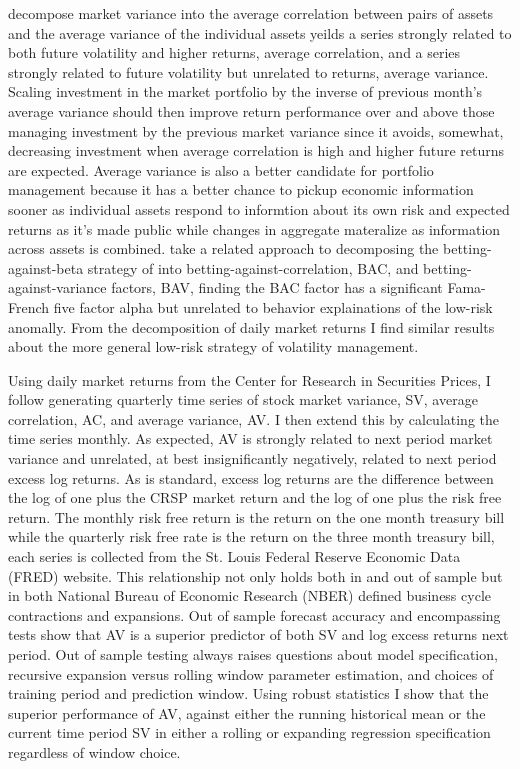 \citet{pollet_average_2010} decompose market variance into the average correlation between pairs of assets and the average variance of the individual assets yeilds a series strongly related to both future volatility and higher returns, average correlation, and a series strongly related to future volatility but unrelated to returns, average variance. Scaling investment in the market portfolio by the inverse of previous month’s average variance should then improve return performance over and above those managing investment by the previous market variance since it avoids, somewhat, decreasing investment when average correlation is high and higher future returns are expected. Average variance is also a better candidate for portfolio management because it has a better chance to pickup economic information sooner as individual assets respond to informtion about its own risk and expected returns as it's made public while changes in aggregate materalize as information across assets is combined.\citep{campbell1997econometrics,campbell_have_2001} \citet{asness_betting_2018} take a related approach to decomposing the betting-against-beta strategy of \citet{frazzini_betting_2014} into betting-against-correlation, BAC, and betting-against-variance factors, BAV, finding the BAC factor has a significant Fama-French five factor alpha but unrelated to behavior explainations of the low-risk anomally.\citep{fama_dissecting_2016} From the decomposition of daily market returns I find similar results about the more general low-risk strategy of volatility management.

Using daily market returns from the Center for Research in Securities Prices, I follow \citet{pollet_average_2010} generating quarterly time series of stock market variance, SV, average correlation, AC, and average variance, AV. I then extend this by calculating the time series monthly. As expected, AV is strongly related to next period market variance and unrelated, at best insignificantly negatively, related to next period excess log returns. As is standard, excess log returns are the difference between the log of one plus the CRSP market return and the log of one plus the risk free return. The monthly risk free return is the return on the one month treasury bill while the quarterly risk free rate is the return on the three month treasury bill, each series is collected from the St. Louis Federal Reserve Economic Data (FRED) website. This relationship not only holds both in and out of sample but in both National Bureau of Economic Research (NBER) defined business cycle contractions and expansions. Out of sample forecast accuracy and encompassing tests show that AV is a superior predictor of both SV and log excess returns next period. Out of sample testing always raises questions about model specification, recursive expansion versus rolling window parameter estimation, and choices of training period and prediction window. Using \citet{rossi_out--sample_2012} robust statistics I show that the superior performance of AV, against either the running historical mean or the current time period SV in either a rolling or expanding regression specification regardless of window choice. 

